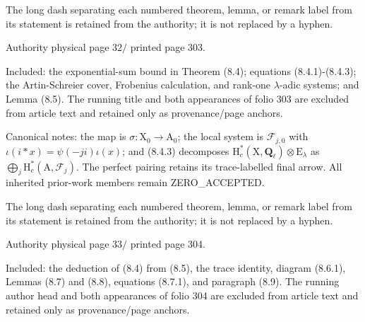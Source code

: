\documentclass[10pt,leqno]{article}
\begin{document}
\noindent The long dash separating each numbered theorem, lemma, or remark label from its statement is retained from the authority; it is not replaced by a hyphen.\par

\clearpage

\label{physical-32}\par\smallskip

\noindent Authority physical page \(32 /\) printed page 303.\par

\noindent Included: the exponential-sum bound in Theorem (8.4); equations (8.4.1)-(8.4.3); the Artin-Schreier cover, Frobenius calculation, and rank-one \(\lambda \)-adic systems; and Lemma (8.5). The running title and both appearances of folio 303 are excluded from article text and retained only as provenance/page anchors.\par

\noindent Canonical notes: the map is \(\sigma :\mathrm{X}_{0}\longrightarrow \mathrm{A}_{0}\); the local system is \(\mathcal{F} _{j,0}\) with \(\iota (i*x)=\psi (-ji)\iota (x)\); and (8.4.3) decomposes \(\mathrm{H}_{c}^{*}(\mathrm{X},\mathbf{Q}_{\ell })\otimes \mathrm{E}_{\lambda }\) as \(\bigoplus\limits_{j} \mathrm{H}_{c}^{*}(\mathrm{A},\mathcal{F} _{j})\). The perfect pairing retains its trace-labelled final arrow. All inherited prior-work members remain ZERO\_ACCEPTED.\par

\noindent The long dash separating each numbered theorem, lemma, or remark label from its statement is retained from the authority; it is not replaced by a hyphen.\par

\clearpage

\label{physical-33}\par\smallskip

\noindent Authority physical page \(33 /\) printed page 304.\par

\noindent Included: the deduction of (8.4) from (8.5), the trace identity, diagram (8.6.1), Lemmas (8.7) and (8.8), equations (8.7.1), and paragraph (8.9). The running author head and both appearances of folio 304 are excluded from article text and retained only as provenance/page anchors.\par
\end{document}
